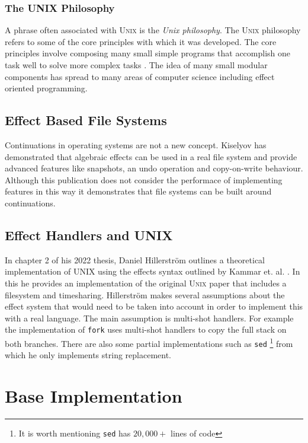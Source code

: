 \documentclass[logo,bsc,singlespacing,parskip]{infthesis}
\begin{document}
\subsection{The UNIX Philosophy}

A phrase often associated with \textsc{Unix} is the \emph{Unix philosophy}.  The
\textsc{Unix} philosophy refers to some of the core principles with which it was
developed. The core principles involve composing many small simple programs that
accomplish one task well to solve more complex tasks \cite{raymond2003art}. The
idea of many small modular components has spread to many areas of computer
science including effect oriented programming.

\section{Effect Based File Systems}

Continuations in operating systems \cite{DBLP:conf/context/KiselyovS07} are not
a new concept.  Kiselyov has demonstrated that algebraic effects can be used in
a real file system and provide advanced features like snapshots, an undo
operation and copy-on-write behaviour. Although this publication does not
consider the performace of implementing features in this way it demonstrates that
file systems can be built around continuations.

\section{Effect Handlers and UNIX}

In chapter 2 of his 2022 thesis, Daniel Hillerstr\"{o}m
\cite{hillerstrom2022foundations} outlines a theoretical implementation of UNIX
using the effects syntax outlined by Kammar et. al. \cite{kammar2013handlers}.
In this he provides an implementation of the original \textsc{Unix} paper
\cite{ritchie1978unix} that includes a filesystem and timesharing.
Hillerstr\"{o}m makes several assumptions about the effect system that would
need to be taken into account in order to implement this with a real language.
The main assumption is multi-shot handlers. For example the implementation of
\texttt{fork} uses multi-shot handlers to copy the full stack on both branches.
There are also some partial implementations such as \texttt{sed} \footnote{It is
worth mentioning \texttt{sed} has $20,000+$ lines of code} from which he only
implements string replacement.

\chapter{Base Implementation}
\label{baseimplementation}
\end{document}
